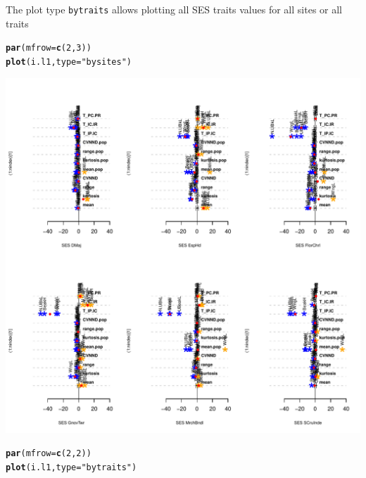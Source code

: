\documentclass[12pt]{article}\usepackage[]{graphicx}\usepackage[]{color}
\makeatletter
\def\maxwidth{ %
  \ifdim\Gin@nat@width>\linewidth
    \linewidth
  \else
    \Gin@nat@width
  \fi
}
\newcommand{\hlnum}[1]{\textcolor[rgb]{0.686,0.059,0.569}{#1}}%
\newcommand{\hlstr}[1]{\textcolor[rgb]{0.192,0.494,0.8}{#1}}%
\newcommand{\hlstd}[1]{\textcolor[rgb]{0.345,0.345,0.345}{#1}}%
\newcommand{\hlkwc}[1]{\textcolor[rgb]{0.333,0.667,0.333}{#1}}%
\newcommand{\hlkwd}[1]{\textcolor[rgb]{0.737,0.353,0.396}{\textbf{#1}}}%
\newenvironment{kframe}{%
 \def\at@end@of@kframe{}%
 \ifinner\ifhmode%
  \def\at@end@of@kframe{\end{minipage}}%
  \begin{minipage}{\columnwidth}%
 \fi\fi%
 \def\FrameCommand##1{\hskip\@totalleftmargin \hskip-\fboxsep
 \colorbox{shadecolor}{##1}\hskip-\fboxsep
     \hskip-\linewidth \hskip-\@totalleftmargin \hskip\columnwidth}%
 \MakeFramed {\advance\hsize-\width
   \@totalleftmargin\z@ \linewidth\hsize
   \@setminipage}}%
 {\par\unskip\endMakeFramed%
 \at@end@of@kframe}
\newenvironment{knitrout}{}{} %
\makeatother
\begin{document}
The plot type \texttt{bytraits} allows plotting all SES traits values for all sites or all traits
\begin{knitrout}
\color{fgcolor}\begin{kframe}
\begin{alltt}
\hlkwd{par}\hlstd{(}\hlkwc{mfrow} \hlstd{=} \hlkwd{c}\hlstd{(}\hlnum{2}\hlstd{,}\hlnum{3}\hlstd{))}
\hlkwd{plot}\hlstd{(i.l1,}\hlkwc{type} \hlstd{=} \hlstr{"bysites"}\hlstd{)}
\end{alltt}
\end{kframe}
\includegraphics[width=\maxwidth]{figure/unnamed-chunk-491} 
\begin{kframe}\begin{alltt}
\hlkwd{par}\hlstd{(}\hlkwc{mfrow} \hlstd{=} \hlkwd{c}\hlstd{(}\hlnum{2}\hlstd{,}\hlnum{2}\hlstd{))}
\hlkwd{plot}\hlstd{(i.l1,}\hlkwc{type} \hlstd{=} \hlstr{"bytraits"}\hlstd{)}
\end{alltt}
\end{kframe}

\end{knitrout}
\end{document}
